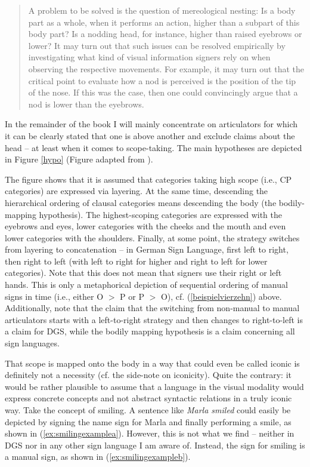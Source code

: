 \begin{quote}
A problem to be solved is the question of mereological nesting: Is a body part as a whole, when it performs an action, higher than a subpart of this body part? Is a nodding head, for instance, higher than raised eyebrows or lower? It may turn out that such issues can be resolved empirically by investigating what kind of visual information signers rely on when observing the respective movements. For example, it may turn out that the critical point to evaluate how a nod is perceived is the position of the tip of the nose. If this was the case, then one could convincingly argue that a nod is lower than the eyebrows. \citep[24]{bross2017scope}
\end{quote}

\noindent In the remainder of the book I will mainly concentrate on articulators for which it can be clearly stated that one is above another and exclude claims about the head -- at least when it comes to scope-taking. The main hypotheses are depicted in Figure \ref{hypo} (Figure adapted from \citealt[25]{bross2017scope}).

The figure shows that it is assumed that categories taking high scope (i.e., CP categories) are expressed via layering. At the same time, descending the hierarchical ordering of clausal categories means descending the body (the bodily-mapping hypothesis). The highest-scoping categories are expressed with the eyebrows and eyes, lower categories with the cheeks and the mouth and even lower categories with the shoulders. Finally, at some point, the strategy switches from layering to concatenation -- in German Sign Language, first left to right, then right to left (with left to right for higher and right to left for lower categories). Note that this does not mean that signers use their right or left hands. This is only a metaphorical depiction of sequential ordering of manual signs in time (i.e., either O $>$ P or P $>$ O), cf. (\ref{beispielvierzehn}) above. Additionally, note that the claim that the switching from non-manual to manual articulators starts with a left-to-right strategy and then changes to right-to-left is a claim for DGS, while the bodily mapping hypothesis is a claim concerning all sign languages. 

That scope is mapped onto the body in a way that could even be called iconic is definitely not a necessity (cf. the side-note on iconicity). Quite the contrary: it would be rather plausible to assume that a language in the visual modality would express concrete concepts and not abstract syntactic relations in a truly iconic way. Take the concept of smiling. A sentence like \textit{Marla smiled} could easily be depicted by signing the name sign for Marla and finally performing a smile, as shown in (\ref{ex:smilingexamplea}). However, this is not what we find -- neither in DGS nor in any other sign language I am aware of. Instead, the sign for smiling is a manual sign, as shown in (\ref{ex:smilingexampleb}).

